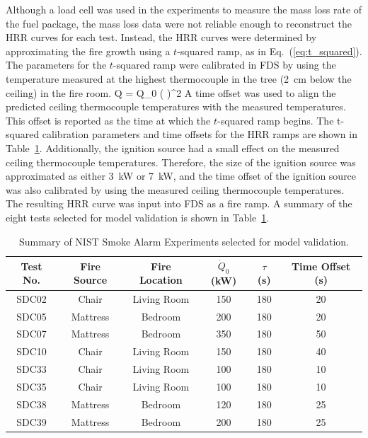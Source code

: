 Although a load cell was used in the experiments to measure the mass loss rate of the fuel package, the mass loss data were not reliable enough to reconstruct the HRR curves for each test. Instead, the HRR curves were determined by approximating the fire growth using a $t$-squared ramp, as in Eq.~(\ref{eq:t_squared}). The parameters for the $t$-squared ramp were calibrated in FDS by using the temperature measured at the highest thermocouple in the tree (2~cm below the ceiling) in the fire room.
\be
\dot Q = \dot Q_0 \left(  \right)^2
\label{eq:t_squared}
\ee
A time offset was used to align the predicted ceiling thermocouple temperatures with the measured temperatures. This offset is reported as the time at which the $t$-squared ramp begins. The t-squared calibration parameters and time offsets for the HRR ramps are shown in Table~\ref{tab:NIST_Smoke_Alarms_Summary}. Additionally, the ignition source had a small effect on the measured ceiling thermocouple temperatures. Therefore, the size of the ignition source was approximated as either 3~kW or 7~kW, and the time offset of the ignition source was also calibrated by using the measured ceiling thermocouple temperatures. The resulting HRR curve was input into FDS as a fire ramp. A summary of the eight tests selected for model validation is shown in Table~\ref{tab:NIST_Smoke_Alarms_Summary}.

\begin{table}[h!]
\centering
\caption[Summary of NIST Smoke Alarm Experiments selected for model validation]{Summary of NIST Smoke Alarm Experiments selected for model validation.}
\begin{tabular}{|c|c|c|c|c|c|}
\hline
Test No.  &  Fire Source  &  Fire Location  &  $\dot Q_0$ (kW)  &  $\tau$ (s)  &  Time Offset (s)  \\ \hline \hline
SDC02     &  Chair        &  Living Room    &  150              &  180         &  20               \\ \hline
SDC05     &  Mattress     &  Bedroom        &  200              &  180         &  20               \\ \hline
SDC07     &  Mattress     &  Bedroom        &  350              &  180         &  50               \\ \hline
SDC10     &  Chair        &  Living Room    &  150              &  180         &  40               \\ \hline
SDC33     &  Chair        &  Living Room    &  100              &  180         &  10               \\ \hline
SDC35     &  Chair        &  Living Room    &  100              &  180         &  10               \\ \hline
SDC38     &  Mattress     &  Bedroom        &  120              &  180         &  25               \\ \hline
SDC39     &  Mattress     &  Bedroom        &  200              &  180         &  25               \\ \hline
\end{tabular}
\label{tab:NIST_Smoke_Alarms_Summary}
\end{table}

